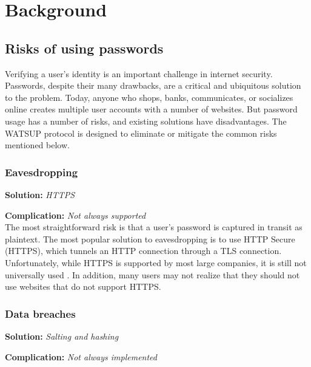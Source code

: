 \section{Background}
\label{sec:background}

\subsection{Risks of using passwords}

Verifying a user's identity is an important challenge in internet security. Passwords, despite their many drawbacks, are a critical and ubiquitous solution to the problem. Today, anyone who shops, banks, communicates, or socializes online creates multiple user accounts with a number of websites. But password usage has a number of risks, and existing solutions have disadvantages. The WATSUP protocol is designed to eliminate or mitigate the common risks mentioned below.


\subsubsection{Eavesdropping}

\textbf{Solution:} \emph{HTTPS}

\noindent\textbf{Complication:} \emph{Not always supported}\\

\noindent The most straightforward risk is that a user's password is captured in transit as plaintext. The most popular solution to eavesdropping is to use HTTP Secure (HTTPS), which tunnels an HTTP connection through a TLS connection. Unfortunately, while HTTPS is supported by most large companies, it is still not universally used \cite{Aas:2016}. In addition, many users may not realize that they should not use websites that do not support HTTPS.


\subsubsection{Data breaches}

\textbf{Solution:} \emph{Salting and hashing}

\noindent\textbf{Complication:} \emph{Not always implemented}\\

